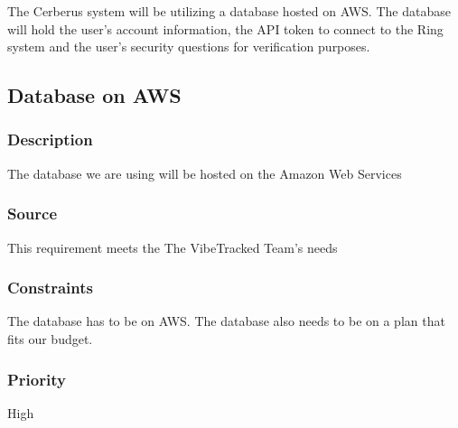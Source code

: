 The Cerberus system will be utilizing a database hosted on AWS. The database will hold the user's account information, the API token to connect to the Ring system and the user's security questions for verification purposes. 

\subsection{Database on AWS}
\subsubsection{Description}
The database we are using will be hosted on the Amazon Web Services
\subsubsection{Source}
This requirement meets the The VibeTracked Team's needs
\subsubsection{Constraints}
The database has to be on AWS. The database also needs to be on a plan that fits our budget.
\subsubsection{Priority}
High